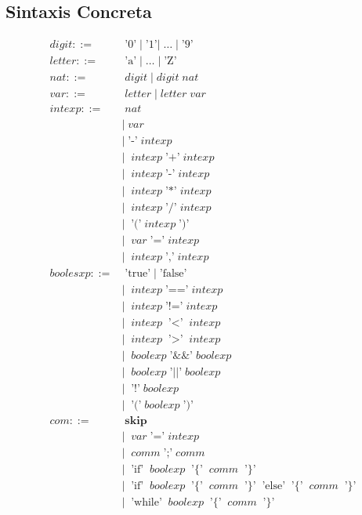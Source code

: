\documentclass[11pt, fleqn]{article}
\begin{document}

\subsection*{Sintaxis Concreta}

\begin{align*}
digit ::=& \; \text{'0'} \; | \; \text{'1'} | \; \dotsc \; | \; \text{'9'} \\
letter ::=& \; \text{'a'} \; | \; \dotsc \; | \; \text{'Z'} \\
nat ::=& \; digit \; | \; digit \; nat \\
var ::=& \; letter \; | \; letter \; var \\
intexp ::=& \; nat \\
          &| \; var \\
          &| \; \text{'-'} \; intexp \\
          &| \;\; intexp \; \text{'+'}  \; intexp \\
          &| \;\; intexp \; \text{'-'}  \; intexp \\
          &| \;\; intexp \; \text{'*'}  \; intexp \\
          &| \;\; intexp \; \text{'/'}  \; intexp \\
          &| \;\; \text{'('} \; intexp \; \text{')'} \\
          &| \;\; var \; \text{'='} \; intexp \\
          &| \;\; intexp \; \text{','} \; intexp \\
boolesxp ::=& \; \text{'true'} \; | \; \text{'false'} \\
            &| \;\; intexp \; \text{'=='} \; intexp \\
            &| \;\; intexp \; \text{'!='}  \; intexp \\
            &| \;\; intexp \; \text{'$<$'}  \; intexp \\
            &| \;\; intexp \; \text{'$>$'}  \; intexp \\
            &| \;\; boolexp \; \text{'\&\&'}  \; boolexp \\
            &| \;\; boolexp \; \text{'$\vert\vert$'}  \; boolexp \\
            &| \;\; \text{'!'} \; boolexp \\
            &| \;\; \text{'('} \; boolexp \; \text{')'} \\
com ::=& \; \textbf{skip} \\
       &| \;\; var \; \text{'='} \; intexp \\
       &| \;\; comm \; \text{';'} \; comm \\
       &| \;\; \text{'if'} \;\;boolexp \;\; \text{'\{'} \;\; comm \;\; \text{'\}'} \\
       &| \;\; \text{'if'} \;\;boolexp \;\; \text{'\{'} \;\; comm \;\; \text{'\}'}  \;\; \text{'else'} \;\; \text{'\{'} \;\; comm \;\; \text{'\}'} \\
       &| \;\; \text{'while'} \;\;boolexp \;\; \text{'\{'} \;\; comm \;\; \text{'\}'} \\
\end{align*}
\end{document}
